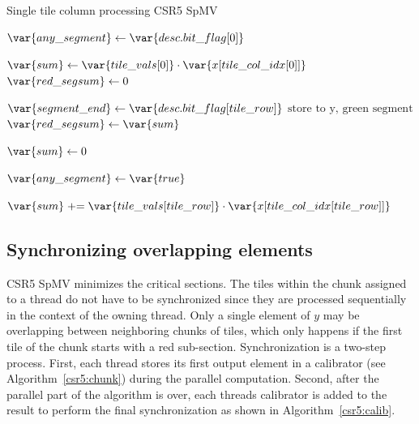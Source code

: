 \documentclass[thesis=M,english]{FITthesis}[2019/12/23]
\newcommand{\pluseq}{\mathrel{+}=}
\begin{document}
\begin{algorithm}[h]
    \caption{Single tile column processing CSR5 SpMV}\label{csr5:spmv:single_tile}
    \begin{algorithmic}

        \State $\var{any\_segment} \gets \var{desc.bit\_flag[0]}$

        \State $\var{sum} \gets \var{tile\_vals[0]} \cdot \var{x[tile\_col\_idx[0]]}$
        \State $\var{red\_segsum} \gets 0$

        \State $\var{segment\_end} \gets \var{desc.bit\_flag[tile\_row]}$
        \State $\text{store to y, green segment}$
        \Else
        \State $\var{red\_segsum} \gets \var{sum}$
        \EndIf

        \State $\var{sum} \gets 0$

        \State $\var{any\_segment} \gets \var{true}$
        \EndIf

        \State $\var{sum} \pluseq \var{tile\_vals[tile\_row]} \cdot \var{x[tile\_col\_idx[tile\_row]]}$
        \EndFor
        \State ${}$ 
        \EndFunction
    \end{algorithmic}
\end{algorithm}


\subsection{Synchronizing overlapping elements}

CSR5 SpMV minimizes the critical sections. The tiles within the chunk assigned to a thread do not have to be
synchronized since they are processed sequentially in the context of the owning thread. Only a single element of
\(y\) may be overlapping between neighboring chunks of tiles, which only happens if the first tile of the
chunk starts with a red sub-section. Synchronization is a two-step process. First, each thread
stores its first output element in a calibrator (see Algorithm~\ref{csr5:chunk}) during the parallel computation.
Second, after the parallel part of the algorithm is over, each threads calibrator is added to the result
to perform the final synchronization as shown in Algorithm~\ref{csr5:calib}.
\end{document}
